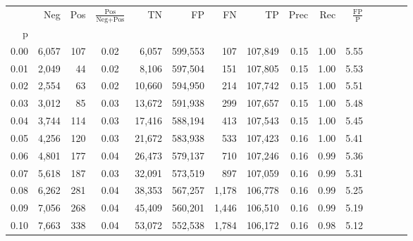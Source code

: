 \begin{tabular}{rrrcrrrrrrrrrrr}
\toprule
{} &     Neg &    Pos & $\frac{\text{Pos}}{\text{Neg}+\text{Pos}}$ &       TN &       FP &       FN &       TP &  Prec &   Rec & $\frac{\text{FP}}{\text{P}}$ \\
p    &         &        &                                            &          &          &          &          &       &       &                              \\
\midrule
0.00 &   6,057 &    107 &                                       0.02 &    6,057 &  599,553 &      107 &  107,849 &  0.15 &  1.00 &                         5.55 \\
0.01 &   2,049 &     44 &                                       0.02 &    8,106 &  597,504 &      151 &  107,805 &  0.15 &  1.00 &                         5.53 \\
0.02 &   2,554 &     63 &                                       0.02 &   10,660 &  594,950 &      214 &  107,742 &  0.15 &  1.00 &                         5.51 \\
0.03 &   3,012 &     85 &                                       0.03 &   13,672 &  591,938 &      299 &  107,657 &  0.15 &  1.00 &                         5.48 \\
0.04 &   3,744 &    114 &                                       0.03 &   17,416 &  588,194 &      413 &  107,543 &  0.15 &  1.00 &                         5.45 \\
0.05 &   4,256 &    120 &                                       0.03 &   21,672 &  583,938 &      533 &  107,423 &  0.16 &  1.00 &                         5.41 \\
0.06 &   4,801 &    177 &                                       0.04 &   26,473 &  579,137 &      710 &  107,246 &  0.16 &  0.99 &                         5.36 \\
0.07 &   5,618 &    187 &                                       0.03 &   32,091 &  573,519 &      897 &  107,059 &  0.16 &  0.99 &                         5.31 \\
0.08 &   6,262 &    281 &                                       0.04 &   38,353 &  567,257 &    1,178 &  106,778 &  0.16 &  0.99 &                         5.25 \\
0.09 &   7,056 &    268 &                                       0.04 &   45,409 &  560,201 &    1,446 &  106,510 &  0.16 &  0.99 &                         5.19 \\
0.10 &   7,663 &    338 &                                       0.04 &   53,072 &  552,538 &    1,784 &  106,172 &  0.16 &  0.98 &                         5.12 \\

\end{tabular}
